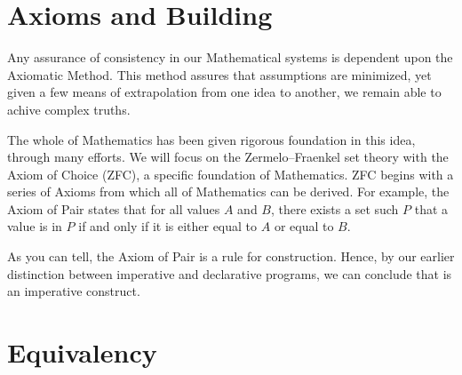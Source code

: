 \documentclass{article}
\begin{document}
\section{Axioms and Building}

Any assurance of consistency in our Mathematical systems is dependent upon the
Axiomatic Method. This method assures that assumptions are minimized, yet given a 
few means of extrapolation from one idea to another, we remain able to achive
complex truths.

The whole of Mathematics has been given rigorous foundation in this idea, through
many efforts. We will focus on the Zermelo–Fraenkel set theory with the Axiom of 
Choice (ZFC), a specific foundation of Mathematics. ZFC begins with a series of
Axioms from which all of Mathematics can be derived. For example, the Axiom of
Pair states that for all values $A$ and $B$, there exists a set such $P$ that a 
value is in $P$ if and only if it is either equal to $A$ or equal to $B$.

As you can tell, the Axiom of Pair is a rule for construction. Hence, by our
earlier distinction between imperative and declarative programs, we can conclude
that is an imperative construct.

\section{Equivalency}
\end{document}

